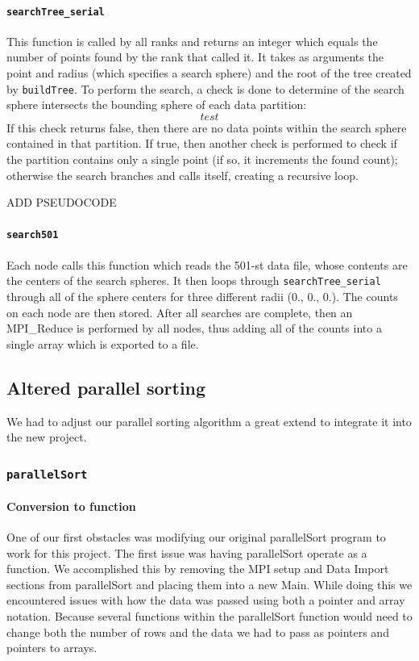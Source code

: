 \documentclass{article}
\begin{document}
\paragraph{\texttt{searchTree\_serial}}
This function is called by all ranks and returns an integer which equals the number of points found by the rank that called it. It takes as arguments the point and radius (which specifies a search sphere) and the root of the tree created by \texttt{buildTree}. To perform the search, a check is done to determine of the search sphere intersects the bounding sphere of each data partition:
\begin{equation}
		test
\end{equation}
If this check returns false, then there are no data points within the search sphere contained in that partition. If true, then another check is performed to check if the partition contains only a single point (if so, it increments the found count); otherwise the search branches and calls itself, creating a recursive loop.


ADD PSEUDOCODE


\paragraph{\texttt{search501}}
%
%

Each node calls this function which reads the 501-st data file, whose contents are the centers of the search spheres. It then loops through \texttt{searchTree\_serial} through all of the sphere centers for three different radii (0., 0., 0.). The counts on each node are then stored. After all searches are complete, then an MPI\_Reduce is performed by all nodes, thus adding all of the counts into a single array which is exported to a file.


\subsection{Altered parallel sorting}
We had to adjust our parallel sorting algorithm a great extend to integrate it into the new project.


\subsubsection{\texttt{parallelSort}}


\paragraph{Conversion to function}
One of our first obstacles was modifying our original parallelSort program to work for this project. The first issue was having parallelSort operate as a function. We accomplished this by removing the MPI setup and Data Import sections from parallelSort and placing them into a new Main. While doing this we encountered issues with how the data was passed using both a pointer and array notation. Because several functions within the parallelSort function would need to change both the number of rows and the data we had to pass as pointers and pointers to arrays. 
\end{document}
